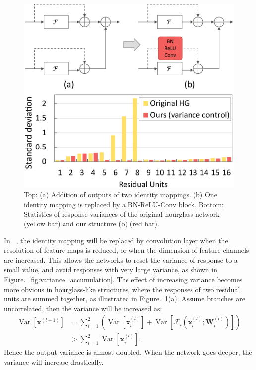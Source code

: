 \documentclass[10pt,twocolumn,letterpaper]{article}
\newcommand{\cF}{\mathcal{F}}
\newcommand{\W}{\mathbf{W}}
\newcommand{\bx}{\mathbf{x}}
\newcommand{\Var}{\operatorname{Var}}
\begin{document}
\begin{figure}[t]
	\begin{center}
		\includegraphics[width=0.8\linewidth]{figures/useconv6.pdf}
	\end{center}
		\vspace{-0.3em}
	\caption{ 
	Top: (a) Addition of outputs of two identity mappings. 
	(b) One identity mapping is replaced by a BN-ReLU-Conv block. 
	Bottom: Statistics of response variances of the original hourglass network (yellow bar) and our structure (b) (red bar).
	}
	\label{fig:Useconv}
	\vspace{-1em}
\end{figure}

In ~\cite{he2016deep,he2016identity}, the identity mapping will be replaced by convolution layer when the resolution of feature maps is reduced, or when the dimension of feature channels are increased. 
This allows the networks to reset the variance of response to a small value, and avoid responses with very large variance, as shown in Figure.~\ref{fig:variance_accumulation}. 
The effect of increasing variance becomes more obvious in hourglass-like structures, where the responses of two residual units are summed together, as illustrated in Figure.~\ref{fig:Useconv}(a). 
Assume branches are uncorrelated, then the variance will be increased as:
{\small
\begin{align}
\Var\left[\bx^{(l+1)}\right] &= \sum_{i=1}^{2} \left( \Var\left[\bx^{(l)}_i\right] + \Var\left[\cF_i\left(\bx^{(l)}_i; \W^{(l)}_i\right)\right]  \right) \nonumber \\
&> \sum_{i=1}^{2} \Var\left[\bx^{(l)}_i\right].
\end{align}
}
\!\!Hence the output variance is almost doubled. When the network goes deeper, the variance will increase drastically.
\end{document}
